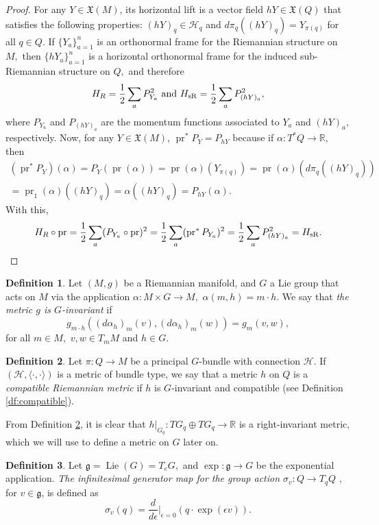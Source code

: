 \documentclass[12pt, letterpaper, reqno]{amsart}
\theoremstyle{definition}
\newtheorem{df}{Definition}
\theoremstyle{plain}
\theoremstyle{remark}
\begin{document}
\begin{proof}
	For any $ Y \in \mathfrak{X}(M) $, its horizontal lift is a vector field $ hY \in \mathfrak{X}(Q) $ that satisfies the following properties: $ (hY)_q \in \mathcal{H}_q $ and $ d\pi_q( (hY)_q) = Y_{\pi(q)}$ for all $ q\in Q. $  If $\{Y_a\}_{a=1}^n $ is an orthonormal frame for the Riemannian structure on $ M, $ then $ \{hY_a\}_{a=1}^n $ is a horizontal orthonormal frame for the induced sub-Riemannian structure on $ Q, $ and therefore
	$$ H_R = \frac{1}{2} \sum^{}_{a} P_{Y_a}^2 \text{ and } H_{\rm sR} = \frac{1}{2} \sum^{}_{a} P_{(hY)_a}^2, $$ 
	where $ P_{Y_a} $ and $ P_{(hY)_a} $ are the momentum functions associated to $ Y_a $ and $ (hY)_a, $ respectively. Now, for any $ Y\in \mathfrak{X}(M) $, $ \operatorname{pr} ^* P_Y = P_{hY}$ because if $ \alpha: T^*Q \rightarrow \mathbb{R}, $ then
	\begin{align*}
	(\operatorname{pr}^*P_Y)(\alpha)=P_Y( \operatorname{pr} (\alpha)) = \operatorname{pr} (\alpha) (Y_{\pi(q)}) = \operatorname{pr} (\alpha) \left( d\pi_q((hY)_q) \right) \\= \operatorname{pr}_1(\alpha) \left( (hY)_q \right) =\alpha( (hY)_q ) =  P_{hY}(\alpha).  
	\end{align*}
	With this, 
	$$ H_R \circ \operatorname{pr} = \frac{1}{2} \sum^{}_{a} (P_{Y_a}\circ \operatorname{pr} )^2 = \frac{1}{2} \sum^{}_{a} (\operatorname{pr}^* P_{Y_a})^2 = \frac{1}{2} \sum^{}_{a} P_{(hY)_a}^2=H_{\rm sR}. $$ 
\end{proof}
\begin{df}
	Let $ (M,g) $ be a Riemannian manifold, and $G $ a Lie group that acts on $ M $ via the application $ \alpha: M\times G \rightarrow M, $ $ \alpha(m,h)= m\cdot h. $ We say that \textit{the metric $ g $ is $ G $-invariant} if  
	$$ g_{m\cdot h}((d\alpha_h)_m(v),(d\alpha_h)_m(w))=g_m(v,w), $$ 
	for all $ m\in M, $ $ v,w\in T_mM $ and $ h\in G. $ 
\end{df}

\begin{df}\label{df:compatible_riemannian_metric}
	Let $ \pi: Q \rightarrow M $ be a principal $ G $-bundle with connection $ \mathcal{H}. $ If $ (\mathcal{H},\langle\cdot,\cdot\rangle) $ is a metric of bundle type, we say that a metric $ h $ on $ Q $ is a \textit{compatible Riemannian metric} if $ h $ is $ G $-invariant and compatible (see Definition \ref{df:compatible}).
\end{df}
 From Definition \ref{df:compatible_riemannian_metric}, it is clear that $ h|_{G_q}: TG_q \oplus TG_q \rightarrow \mathbb{R} $ is a right-invariant metric, which we will use to define a metric on $ G $ later on.
 \begin{df}
Let $ \mathfrak{g}= \operatorname{Lie}(G)=T_eG, $ and $ \operatorname{exp} : \mathfrak{g}\rightarrow G $ be the exponential application. \textit{The infinitesimal generator map for the group action $ \sigma_v: Q\rightarrow T_qQ $ }, for $ v \in \mathfrak{g} $,  is defined as
$$ \sigma_v(q) = \frac{d}{d\epsilon} \Big|_{\epsilon=0} \left( q\cdot \operatorname{exp} (\epsilon v) \right).$$ 
 \end{df}
\end{document}

